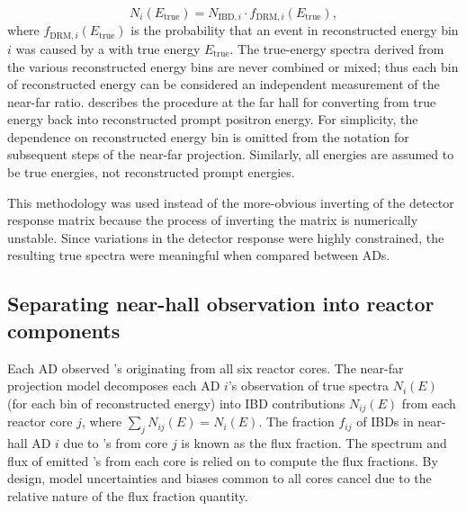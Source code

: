 \begin{equation}
    N_i(E_{\text{true}}) = N_{\text{IBD},i} \cdot f_{\text{DRM},i}(E_{\text{true}}),
\end{equation}
where $f_{\text{DRM},i}(E_{\text{true}})$ is the probability
that an event in reconstructed energy bin $i$
was caused by a \nuebar{} with true energy $E_{\text{true}}$.
The true-energy spectra derived from the various reconstructed energy bins
are never combined or mixed;
thus each bin of reconstructed energy can be considered an independent measurement
of the near-far ratio.
 describes the procedure at the far hall
for converting from true \nuebar{} energy back into reconstructed prompt positron energy.
For simplicity, the dependence on reconstructed energy bin is omitted
from the notation for subsequent steps of the near-far projection.
Similarly, all energies are assumed to be true \nuebar{} energies,
not reconstructed prompt energies.

This methodology was used instead of the more-obvious
inverting of the detector response matrix
because the process of inverting the matrix is numerically unstable.
Since variations in the detector response were highly constrained,
the resulting true \nuebar{} spectra were meaningful when compared between ADs.


\begin{figure}
    \label{fig:drm}
\end{figure}


\subsection{Separating near-hall observation into reactor components}
\label{subsec:flux_fraction}

Each AD observed \nuebar{}'s originating from all six reactor cores.
The near-far projection model decomposes each AD $i$'s observation
of true \nuebar{} spectra $N_i(E)$ (for each bin of reconstructed energy)
into IBD contributions $N_{ij}(E)$ from each reactor core $j$,
where $\sum_j N_{ij}(E) = N_i(E)$.
The fraction $f_{ij}$ of IBDs in near-hall AD $i$
due to \nuebar{}'s from core $j$ is known as the flux fraction.
The spectrum and flux of emitted \nuebar{}'s from each core is relied on
to compute the flux fractions.
By design, model uncertainties and biases common to all cores cancel
due to the relative nature of the flux fraction quantity.

